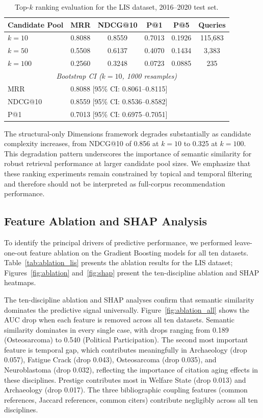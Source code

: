 \documentclass[11pt,a4paper]{article}
\begin{document}
\begin{table}[H]
\centering
\caption{Top-\(k\) ranking evaluation for the LIS dataset, 2016--2020 test set.}
\label{tab:ranking}
\begin{tabular}{lccccc}
\toprule
\textbf{Candidate Pool} & \textbf{MRR} & \textbf{NDCG@10} & \textbf{P@1} & \textbf{P@5} & \textbf{Queries} \\
\midrule
\(k=10\) & 0.8088 & 0.8559 & 0.7013 & 0.1926 & 115,683 \\
\(k=50\) & 0.5508 & 0.6137 & 0.4070 & 0.1434 & 3,383 \\
\(k=100\) & 0.2560 & 0.3248 & 0.0723 & 0.0885 & 235 \\
\midrule
\multicolumn{6}{c}{\textit{Bootstrap CI (\(k=10\), 1000 resamples)}} \\
MRR & \multicolumn{5}{l}{0.8088 [95\% CI: 0.8061--0.8115]} \\
NDCG@10 & \multicolumn{5}{l}{0.8559 [95\% CI: 0.8536--0.8582]} \\
P@1 & \multicolumn{5}{l}{0.7013 [95\% CI: 0.6975--0.7051]} \\
\bottomrule
\end{tabular}
\end{table}

The structural-only Dimensions framework degrades substantially as candidate complexity increases, from NDCG@10 of 0.856 at $k=10$ to 0.325 at $k=100$. This degradation pattern underscores the importance of semantic similarity for robust retrieval performance at larger candidate pool sizes. We emphasize that these ranking experiments remain constrained by topical and temporal filtering and therefore should not be interpreted as full-corpus recommendation performance.

\subsection{Feature Ablation and SHAP Analysis}
\label{sec:ablation}

To identify the principal drivers of predictive performance, we performed leave-one-out feature ablation on the Gradient Boosting models for all ten datasets. Table~\ref{tab:ablation_lis} presents the ablation results for the LIS dataset; Figures~\ref{fig:ablation} and~\ref{fig:shap} present the ten-discipline ablation and SHAP heatmaps.

The ten-discipline ablation and SHAP analyses confirm that semantic similarity dominates the predictive signal universally. Figure~\ref{fig:ablation_all} shows the AUC drop when each feature is removed across all ten datasets. Semantic similarity dominates in every single case, with drops ranging from 0.189 (Osteosarcoma) to 0.540 (Political Participation). The second most important feature is temporal gap, which contributes meaningfully in Archaeology (drop 0.057), Fatigue Crack (drop 0.043), Osteosarcoma (drop 0.035), and Neuroblastoma (drop 0.032), reflecting the importance of citation aging effects in these disciplines. Prestige contributes most in Welfare State (drop 0.013) and Archaeology (drop 0.017). The three bibliographic coupling features (common references, Jaccard references, common citers) contribute negligibly across all ten disciplines.
\end{document}

